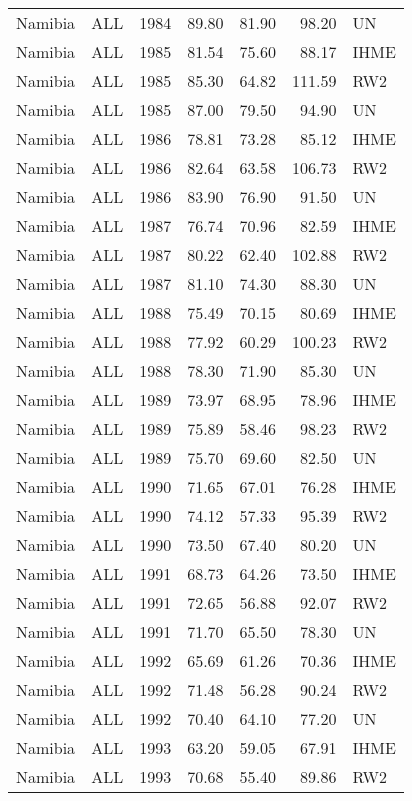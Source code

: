 \begin{longtable}{lllrrrl}
  Namibia & ALL & 1984 & 89.80 & 81.90 & 98.20 & UN \\ 
  Namibia & ALL & 1985 & 81.54 & 75.60 & 88.17 & IHME \\ 
  Namibia & ALL & 1985 & 85.30 & 64.82 & 111.59 & RW2 \\ 
  Namibia & ALL & 1985 & 87.00 & 79.50 & 94.90 & UN \\ 
  Namibia & ALL & 1986 & 78.81 & 73.28 & 85.12 & IHME \\ 
  Namibia & ALL & 1986 & 82.64 & 63.58 & 106.73 & RW2 \\ 
  Namibia & ALL & 1986 & 83.90 & 76.90 & 91.50 & UN \\ 
  Namibia & ALL & 1987 & 76.74 & 70.96 & 82.59 & IHME \\ 
  Namibia & ALL & 1987 & 80.22 & 62.40 & 102.88 & RW2 \\ 
  Namibia & ALL & 1987 & 81.10 & 74.30 & 88.30 & UN \\ 
  Namibia & ALL & 1988 & 75.49 & 70.15 & 80.69 & IHME \\ 
  Namibia & ALL & 1988 & 77.92 & 60.29 & 100.23 & RW2 \\ 
  Namibia & ALL & 1988 & 78.30 & 71.90 & 85.30 & UN \\ 
  Namibia & ALL & 1989 & 73.97 & 68.95 & 78.96 & IHME \\ 
  Namibia & ALL & 1989 & 75.89 & 58.46 & 98.23 & RW2 \\ 
  Namibia & ALL & 1989 & 75.70 & 69.60 & 82.50 & UN \\ 
  Namibia & ALL & 1990 & 71.65 & 67.01 & 76.28 & IHME \\ 
  Namibia & ALL & 1990 & 74.12 & 57.33 & 95.39 & RW2 \\ 
  Namibia & ALL & 1990 & 73.50 & 67.40 & 80.20 & UN \\ 
  Namibia & ALL & 1991 & 68.73 & 64.26 & 73.50 & IHME \\ 
  Namibia & ALL & 1991 & 72.65 & 56.88 & 92.07 & RW2 \\ 
  Namibia & ALL & 1991 & 71.70 & 65.50 & 78.30 & UN \\ 
  Namibia & ALL & 1992 & 65.69 & 61.26 & 70.36 & IHME \\ 
  Namibia & ALL & 1992 & 71.48 & 56.28 & 90.24 & RW2 \\ 
  Namibia & ALL & 1992 & 70.40 & 64.10 & 77.20 & UN \\ 
  Namibia & ALL & 1993 & 63.20 & 59.05 & 67.91 & IHME \\ 
  Namibia & ALL & 1993 & 70.68 & 55.40 & 89.86 & RW2 \\ 

\end{longtable}
